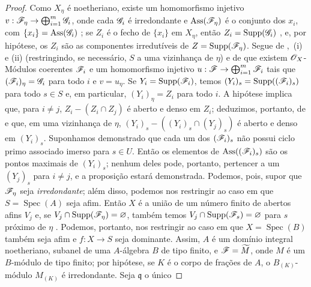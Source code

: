 \begin{proof}
Como $X_\eta$ é noetheriano, existe um homomorfismo injetivo $v:\sh{F}_\eta\to\bigoplus_{i=1}^m\sh{G}_i$, onde cada $\mathscr{G}_i$ é irredondante e $\operatorname{Ass}(\mathscr{F}_\eta)$ é o conjunto dos $x_i$, com $\{x_i\}=\operatorname{Ass}(\mathscr{G}_i)$ ; se $Z_i$ é o fecho de $\{x_i\}$ em $X_\eta$, então $Z_i=\operatorname{Supp}(\mathscr{G}_i)$ , e, por hipótese, os $Z_i$ são as componentes irredutíveis de $Z=\operatorname{Supp}(\mathscr{F}_\eta)$.
Segue de ,~(i) e (ii) (restringindo, se necessário, $S$ a uma vizinhança de $\eta$) e de  que existem $\mathscr{O}_X$-Módulos coerentes $\mathscr{F}_i$ e um homomorfismo injetivo $u:\sh{F}\to\bigoplus_{i=1}^m\sh{F}_i$ tais que $(\mathscr{F}_i)_\eta=\mathscr{G}_i$ para todo $i$ e $v=u_\eta$.
Se $Y_i=\operatorname{Supp}(\mathscr{F}_i)$, temos $(Y_i)_s=\operatorname{Supp}((\mathscr{F}_i)_s)$ para todo $s\in S$  e, em particular, $(Y_i)_\eta=Z_i$ para todo $i$.
A hipótese implica que, para $i\neq j$, $Z_i-(Z_i\cap Z_j)$ é aberto e denso em $Z_i$; deduzimos, portanto, de  e  que, em uma vizinhança de $\eta$, $(Y_i)_s-((Y_i)_s\cap(Y_j)_s)$ é aberto e denso em $(Y_i)_s$.
Suponhamos demonstrado que cada um dos $(\mathscr{F}_i)_s$ não possui ciclo primo associado imerso para $s\in U$.
Então os elementos de $\operatorname{Ass}((\mathscr{F}_i)_s)$ são os pontos maximais de $(Y_i)_s$; nenhum deles pode, portanto, pertencer a um $(Y_j)_s$ para $i\neq j$, e a proposição estará demonstrada.
Podemos, pois, supor que $\mathscr{F}_\eta$ seja \emph{irredondante}; além disso, podemos nos restringir ao caso em que $S=\operatorname{Spec}(A)$ seja afim.
Então $X$ é a união de um número finito de abertos afins $V_j$ e, se $V_j\cap\operatorname{Supp}(\mathscr{F}_\eta)=\varnothing$, também temos $V_j\cap\operatorname{Supp}(\mathscr{F}_s)=\varnothing$ para $s$ próximo de $\eta$ .
Podemos, portanto, nos restringir ao caso em que $X=\operatorname{Spec}(B)$ também seja afim e $f:X\to S$ seja dominante.
Assim, $A$ é um domínio integral noetheriano, subanel de uma $A$-álgebra $B$ de tipo finito, e $\mathscr{F}=\widetilde{M}$, onde $M$ é um $B$-módulo de tipo finito; por hipótese, se $K$ é o corpo de frações de $A$, o $B_{(K)}$-módulo $M_{(K)}$ é irredondante.
Seja $\mathfrak{q}$ o único



\end{proof}
